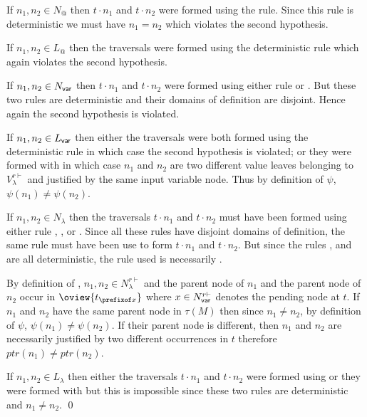 \begin{compactitem}
\item If $n_1, n_2 \in N_@$ then $t
\cdot n_1$ and $t \cdot n_2$ were formed using the 
rule. Since this rule is deterministic we must have $n_1=n_2$ which
violates the second hypothesis.

\item If $n_1, n_2 \in L_@$ then the traversals were formed using the deterministic rule
 which again violates the second
hypothesis.

\item If $n_1,n_2\in N_{\sf var}$ then
     $t \cdot n_1$ and $t \cdot n_2$ were formed using either rule  or .
     But these two rules are deterministic and their domains of definition are disjoint. Hence again the second
     hypothesis is violated.

\item If  $n_1, n_2 \in L_{\sf var}$ then either the traversals were both formed using the deterministic rule
 in which case the second hypothesis
is violated; or they were formed with 
in which case $n_1$ and $n_2$ are two different value leaves belonging to
$V^{r\vdash}_\lambda$ and justified by the same input variable node.
Thus by definition of $\psi$, $\psi(n_1)\neq\psi(n_2)$.

\item If  $n_1,n_2\in N_\lambda$ then the traversals $t \cdot n_1$
    and $t \cdot n_2$ must have been formed using either rule
    , ,  or . Since all these rules have
    disjoint domains of definition, the same rule must have been use to
    form $t \cdot n_1$ and $t \cdot n_2$.
    But since the rules ,  and  are all deterministic,
    the rule used is necessarily .

    By definition of , $n_1,n_2\in N_\lambda^{r\vdash}$ and the parent node of $n_1$ and the parent node of $n_2$  occur in  $\oview{t_{\prefixof x}}$ where $x \in N^{r\vdash}_{\sf var}$
    denotes the pending node at $t$. If $n_1$ and $n_2$ have the same
    parent node in $\tau(M)$ then since $n_1\neq n_2$, by definition of
    $\psi$, $\psi(n_1)\neq \psi(n_2)$. If their parent node is
    different, then $n_1$ and $n_2$ are necessarily justified by two different
    occurrences in $t$ therefore $ptr(n_1) \neq ptr(n_2)$.

\item If  $n_1,n_2\in L_\lambda$ then either the traversals $t \cdot n_1$
    and $t \cdot n_2$ were formed using
     or they were formed with
     but this is impossible since these two rules are
    deterministic and $n_1 \neq n_2$. \qed
\end{compactitem}


